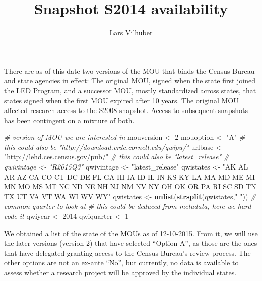 \documentclass[]{article}
\title{Snapshot S2014 availability}
\author{Lars Vilhuber}
\date{}
\newenvironment{Shaded}{\begin{snugshade}}{\end{snugshade}}
\newcommand{\KeywordTok}[1]{\textcolor[rgb]{0.13,0.29,0.53}{\textbf{{#1}}}}
\newcommand{\DecValTok}[1]{\textcolor[rgb]{0.00,0.00,0.81}{{#1}}}
\newcommand{\StringTok}[1]{\textcolor[rgb]{0.31,0.60,0.02}{{#1}}}
\newcommand{\CommentTok}[1]{\textcolor[rgb]{0.56,0.35,0.01}{\textit{{#1}}}}
\newcommand{\NormalTok}[1]{{#1}}
\begin{document}
\maketitle


There are as of this date two versions of the MOU that binds the Census
Bureau and state agencies in effect: The original MOU, signed when the
state first joined the LED Program, and a successor MOU, mostly
standardized across states, that states signed when the first MOU
expired after 10 years. The original MOU affected research access to the
S2008 snapshot. Access to subsequent snapshots has been contingent on a
mixture of both.

\begin{Shaded}
\begin{Highlighting}[]
\CommentTok{# version of MOU we are interested in}
\NormalTok{mouversion <-}\StringTok{ }\DecValTok{2}
\NormalTok{mouoption    <-}\StringTok{ "A"} 
\CommentTok{# this could also be "http://download.vrdc.cornell.edu/qwipu/"}
\NormalTok{urlbase <-}\StringTok{ "http://lehd.ces.census.gov/pub/"}
\CommentTok{# this could also be "latest_release"}
\CommentTok{# qwivintage <- "R2015Q3"}
\NormalTok{qwivintage <-}\StringTok{ "latest_release"}
\NormalTok{qwistates <-}\StringTok{ "AK AL AR AZ CA CO CT DC DE FL GA HI IA ID IL IN KS KY LA MA MD ME MI MN MO MS MT NC ND NE NH NJ NM NV NY OH OK OR PA RI SC SD TN TX UT VA VT WA WI WV WY"}
\NormalTok{qwistates <-}\StringTok{ }\KeywordTok{unlist}\NormalTok{(}\KeywordTok{strsplit}\NormalTok{(qwistates,}\StringTok{" "}\NormalTok{))}
\CommentTok{# common quarter to look at}
\CommentTok{# this could be deduced from metadata, here we hard-code it}
\NormalTok{qwiyear    <-}\StringTok{ }\DecValTok{2014}
\NormalTok{qwiquarter <-}\StringTok{ }\DecValTok{1}
\end{Highlighting}
\end{Shaded}

We obtained a list of the state of the MOUs as of 12-10-2015. From it,
we will use the later versions (version 2) that have selected ``Option
A'', as those are the ones that have delegated granting access to the
Census Bureau's review process. The other options are not an ex-ante
``No'', but currently, no data is available to assess whether a research
project will be approved by the individual states.
\end{document}
